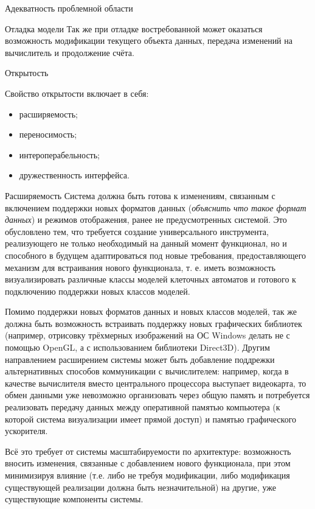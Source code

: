 \documentclass[a4paper,12pt]{extarticle}
\begin{document}
\begin{subsection}{Адекватность проблемной области}
\begin{subsubsection}{Отладка модели}
        Так же при отладке востребованной может оказаться возможность модификации текущего объекта данных, передача изменений на вычислитель и продолжение счёта.
    \end{subsubsection}

\end{subsection}

\begin{subsection}{Открытость}
    \label{sec:requirements-open}

    Свойство открытости включает в себя:
    \begin{itemize}
        \item расширяемость;
        \item переносимость;
        \item интероперабельность;
        \item дружественность интерфейса.
    \end{itemize}

    \begin{subsubsection}{Расширяемость}
        Система должна быть готова к изменениям, связанным с включением поддержки новых форматов данных (\textit{объяснить что такое формат данных}) и режимов отображения, ранее не предусмотренных системой. Это обусловлено тем, что требуется создание универсального инструмента, реализующего не только необходимый на данный момент функционал, но и способного в будущем адаптироваться под новые требования, предоставляющего механизм для встраивания нового функционала, т. е. иметь возможность визуализировать различные классы моделей клеточных автоматов и готового к подключению поддержки новых классов моделей.
        
        Помимо поддержки новых форматов данных и новых классов моделей, так же должна быть возможность встраивать поддержку новых графических библиотек (например, отрисовку трёхмерных изображений на ОС Windows делать не с помощью OpenGL, а с использованием библиотеки Direct3D). Другим направлением расширением системы может быть добавление поддрежки альтернативных способов коммуникации с вычислителем: например, когда в качестве вычислителя вместо центрального процессора выступает видеокарта, то обмен данными уже невозможно организовать через общую память и потребуется реализовать передачу данных между оперативной памятью компьютера (к которой система визуализации имеет прямой доступ) и памятью графического ускорителя.
        
        Всё это требует от системы масштабируемости по архитектуре: возможность вносить изменения, связанные с добавлением нового функционала, при этом минимизируя влияние (т.е. либо не требуя модификации, либо модификация существующей реализации должна быть незначительной) на другие, уже существующие компоненты системы.
    \end{subsubsection}
        

\end{subsection}
\end{document}
